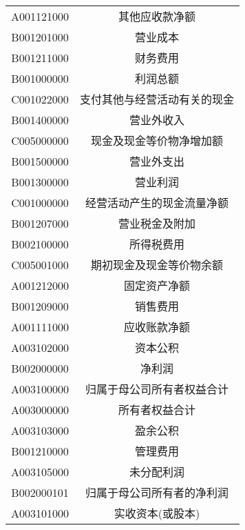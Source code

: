 \begin{longtable}{cc}
A001121000 & 其他应收款净额                 \\
B001201000 & 营业成本                    \\
B001211000 & 财务费用                    \\
B001000000 & 利润总额                    \\
C001022000 & 支付其他与经营活动有关的现金          \\
B001400000 & 营业外收入                   \\
C005000000 & 现金及现金等价物净增加额            \\
B001500000 & 营业外支出                   \\
B001300000 & 营业利润                    \\
C001000000 & 经营活动产生的现金流量净额           \\
B001207000 & 营业税金及附加                 \\
B002100000 & 所得税费用                   \\
C005001000 & 期初现金及现金等价物余额            \\
A001212000 & 固定资产净额                  \\
B001209000 & 销售费用                    \\
A001111000 & 应收账款净额                  \\
A003102000 & 资本公积                    \\
B002000000 & 净利润                     \\
A003100000 & 归属于母公司所有者权益合计           \\
A003000000 & 所有者权益合计                 \\
A003103000 & 盈余公积                    \\
B001210000 & 管理费用                    \\
A003105000 & 未分配利润                   \\
B002000101 & 归属于母公司所有者的净利润           \\
A003101000 & 实收资本(或股本)       \\       
\end{longtable}


